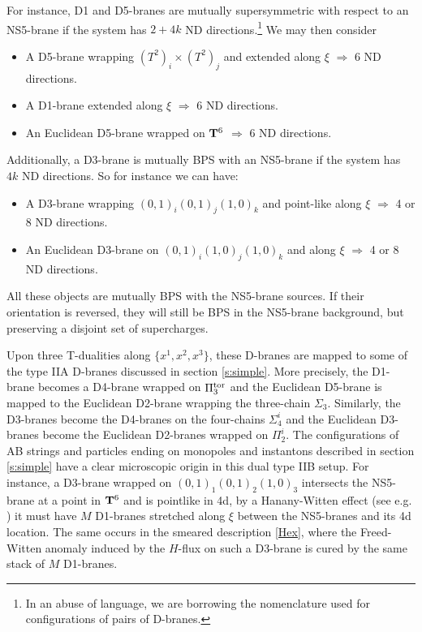 \documentclass[11pt]{article}
\begin{document}
For instance, D1 and D5-branes are mutually supersymmetric with respect to an NS5-brane if the system has $2+4k$ ND directions.\footnote{In an abuse of language, we are borrowing the nomenclature used for configurations of pairs of D-branes.} We may then consider

\begin{itemize}

\item[-] A D5-brane wrapping  $(T^2)_i \times (T^2)_j$ and extended along $\xi$  $\Longrightarrow$ 6 ND directions. 

\item[-] A D1-brane extended along $\xi$ $\Longrightarrow$ 6 ND directions. 

\item[-] An Euclidean D5-brane wrapped on ${\bf T}^6$ $\Longrightarrow$ 6 ND directions.

\end{itemize}
%
Additionally, a D3-brane is mutually BPS with an NS5-brane if the system has $4k$ ND directions. So for instance we can have:

\begin{itemize}

\item[-] A D3-brane wrapping  $(0,1)_i(0,1)_j(1,0)_k$ and point-like along $\xi$  $\Longrightarrow$ 4 or 8 ND directions. 

\item[-] An Euclidean D3-brane on  $(0,1)_i(1,0)_j(1,0)_k$ and along $\xi$  $\Longrightarrow$ 4 or 8 ND directions. 

\end{itemize}
%
All these objects are mutually BPS with the NS5-brane sources. If their orientation is reversed, they will still be BPS in the NS5-brane background, but preserving a disjoint set of supercharges. 

Upon three T-dualities along $\{x^1, x^2, x^3\}$, these D-branes are mapped to some of the type IIA D-branes discussed in section \ref{s:simple}. More precisely,  the D1-brane becomes a D4-brane wrapped on $\Pi_3^{\rm tor}$ and the Euclidean D5-brane is mapped to the Euclidean D2-brane wrapping the three-chain $\Sigma_3$. Similarly, the D3-branes become the D4-branes on the four-chains $\Sigma_4^i$ and the Euclidean D3-branes become the Euclidean D2-branes wrapped on $\Pi_2^i$. The configurations of AB strings and particles ending on monopoles and instantons described in section \ref{s:simple} have a clear microscopic origin in this dual type IIB setup. For instance, a D3-brane wrapped on $(0,1)_1(0,1)_2(1,0)_3$ intersects the NS5-brane at a point in ${\bf T}^6$ and is pointlike in 4d, by a Hanany-Witten effect (see e.g. \cite[Appendix B]{Berasaluce-Gonzalez:2012awn}) it must have $M$ D1-branes stretched along $\xi$ between the NS5-branes and its 4d location. The same occurs in the smeared description \eqref{Hex}, where the Freed-Witten anomaly induced by the $H$-flux on such a D3-brane is cured by the same stack of $M$ D1-branes. 
\end{document}
